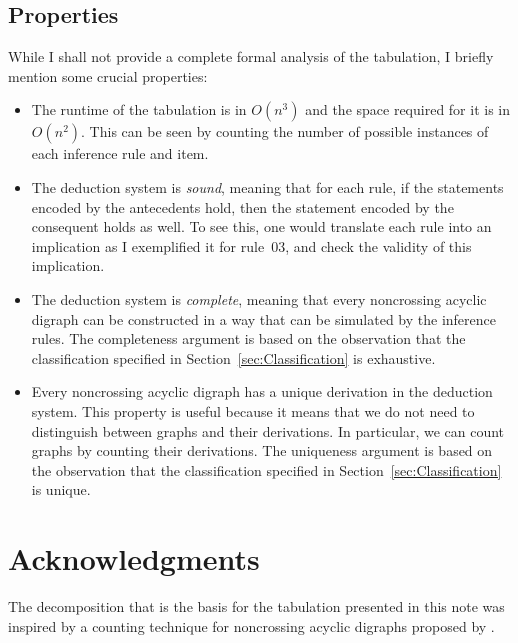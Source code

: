 \documentclass[a4paper]{article}
\begin{document}
\subsection{Properties}

While I shall not provide a complete formal analysis of the tabulation, I briefly mention some crucial properties:
\begin{itemize}
	\item The runtime of the tabulation is in $O(n^3)$ and the space required for it is in $O(n^2)$. This can be seen by counting the number of possible instances of each inference rule and item.
	
	\item The deduction system is \emph{sound}, meaning that for each rule, if the statements encoded by the antecedents hold, then the statement encoded by the consequent holds as well. To see this, one would translate each rule into an implication as I exemplified it for rule~03, and check the validity of this implication.
	
	\item The deduction system is \emph{complete}, meaning that every noncrossing acyclic digraph can be constructed in a way that can be simulated by the inference rules. The completeness argument is based on the observation that the classification specified in Section~\ref{sec:Classification} is exhaustive.
	
	\item Every noncrossing acyclic digraph has a unique derivation in the deduction system. This property is useful because it means that we do not need to distinguish between graphs and their derivations. In particular, we can count graphs by counting their derivations. The uniqueness argument is based on the observation that the classification specified in Section~\ref{sec:Classification} is unique.
\end{itemize}


\section*{Acknowledgments}

The decomposition that is the basis for the tabulation presented in this note was inspired by a counting technique for noncrossing acyclic digraphs proposed by \citet{tirrell2014number}.




\end{document}
